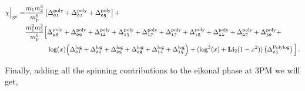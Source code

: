 \begin{tcolorbox}[thesisresultbox, title=\textit{Spinless Eikonal at 3PM}]
\restorethesisbodyformat
\begin{align}  \label{dCSne3waaa}
 \chi\Big|_{\mathcal{S}^0}=&\frac{m_1m_2^3}{m_p^6}\left[\Delta_{\mathfrak{01}}^{\textrm{poly}}+\Delta_{\mathfrak{02}}^{\textrm{poly}}+\Delta_{\mathfrak{05}}^{\textrm{poly}}\right]
+\\&\frac{m_1^2 m_2^2}{m_p^6}\Big[\Delta_{\mathfrak{08}}^{\textrm{poly}}+\Delta_{\mathfrak{09}}^{\textrm{poly}}+\Delta_{\mathfrak{12}}^{\textrm{poly}}+\Delta_{\mathfrak{15}}^{\textrm{poly}}+\Delta_{\mathfrak{17}}^{\textrm{poly}}+\Delta_{\mathfrak{17}}^{\textrm{poly}}+\Delta_{\mathfrak{18}}^{\textrm{poly}}+\Delta_{\mathfrak{22}}^{\textrm{poly}}+\Delta_{\mathfrak{27}}^{\textrm{poly}}+\Delta_{\mathfrak{30}}^{\textrm{poly}}\nonumber+\\ &\hspace{1.2 cm}\log(x)\Big(\Delta_{\mathfrak{01}}^{\textrm{log}}+\Delta_{\mathfrak{02}}^{\textrm{log}}+\Delta_{\mathfrak{05}}^{\textrm{log}}+\Delta_{\mathfrak{09}}^{\textrm{log}}+\Delta_{\mathfrak{12}}^{\textrm{log}}+\Delta_{\mathfrak{15}}^{\textrm{log}}\Big)+(\log^2(x)+\textbf{Li}_2(1-x^2))\left(\Delta_{\mathfrak{03}}^{\textrm{Polylog}}\right)\Big]\,.\nonumber
    \end{align}
\end{tcolorbox}
\restorethesisbodyformat
Finally, adding all the spinning contributions to the eikonal phase at 3PM we will get,
